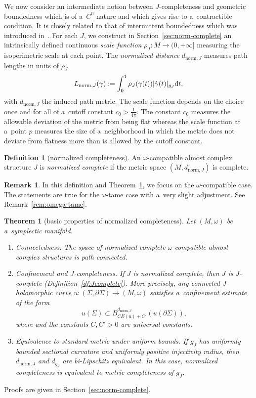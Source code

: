 \documentclass[pdftex]{sigma}
\numberwithin{equation}{section}
\newtheorem{tm}[Theorem]{Theorem}
\theoremstyle{definition}
\newtheorem{df}[Theorem]{Definition}
\newtheorem{rem}[Theorem]{Remark}
\begin{document}
We now consider an intermediate notion between $J$-completeness and geometric boundedness which is of a~$C^0$ nature and which gives rise to a~contractible condition. It is closely related to that of intermittent boundedness which was introduced in~\cite{GromanFloerOpen}. For each $J$, we construct in Section~\ref{sec:norm-complete} an intrinsically defined continuous \emph{scale function} $\rho_J\colon M\to(0,+\infty]$ measuring the isoperimetric scale at each point. The \emph{normalized distance} $d_{\mathrm{norm},J}$ measures path lengths in units of $\rho_J$
\[
L_{\mathrm{norm},J}(\gamma):=\int_{0}^{1}\rho_J(\gamma(t))|\dot\gamma(t)|_{g_J}{\rm d}t,
\]
with $d_{\mathrm{norm},J}$ the induced path metric. The scale function depends on the choice once and for all of a~cutoff constant $c_0>\frac1{4\pi}$. The constant $c_0$ measures the allowable deviation of the metric from being flat whereas the scale function at a~point $p$ measures the size of a~neighborhood in which the metric does not deviate from flatness more than is allowed by the cutoff constant.

\begin{df}[normalized completeness]\label{df:normalized-complete-intro}
An $\omega$-compatible almost complex structure $J$ is \emph{normalized complete} if the metric space $(M,d_{\mathrm{norm},J})$ is complete.
\end{df}
\begin{rem}
In this definition and Theorem~\ref{tm:normalized-completeness}, we focus on the $\omega$-compatible case. The statements are true for the $\omega$-tame case with a~very slight adjustment. See Remark~\ref{rem:omega-tame}.
\end{rem}

\begin{tm}[basic properties of normalized completeness]\label{tm:normalized-completeness}
Let $(M,\omega)$ be a~symplectic mani\-fold.
\begin{enumerate}
\itemsep=0pt
\item[$(1)$] \emph{Connectedness.}
The space of normalized complete $\omega$-compatible almost complex structures is path connected.

\item[$(2)$] \emph{Confinement and $J$-completeness.}
If $J$ is normalized complete, then $J$ is $J$-complete {\rm(}Definition~{\rm\ref{df:Jcomplete})}.
More precisely, any connected $J$-holomorphic curve $u\colon (\Sigma,\partial\Sigma)\to(M,\omega)$ satisfies a~confinement estimate of the form
\[
u(\Sigma)\subset B^{d_{\mathrm{norm},J}}_{CE(u)+C'}(u(\partial\Sigma)),
\]
where  and the constants $C,C'>0$ are universal constants.

\item[$(3)$] \emph{Equivalence to standard metric under uniform bounds.}
If $g_J$ has uniformly bounded sectional curvature and uniformly positive injectivity radius, then $d_{\mathrm{norm},J}$ and $d_{g_J}$ are bi-Lipschitz equivalent. In this case, normalized completeness is equivalent to metric completeness of $g_J$.
\end{enumerate}
\end{tm}
Proofs are given in Section~\ref{sec:norm-complete}.
\end{document}
